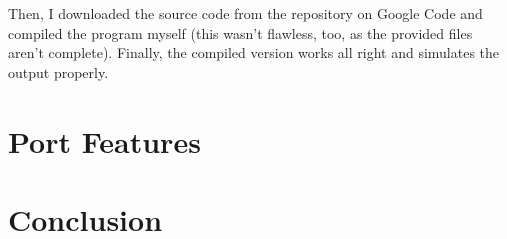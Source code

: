         Then, I downloaded the source code from the repository on Google Code and compiled the program myself (this wasn't flawless, too, as the provided files aren't complete). Finally, the compiled version works all right and simulates the output properly.

        

\chapter{Port Features}\label{features}

\chapter{Conclusion}\label{conclusion}


\cite{TBD}
